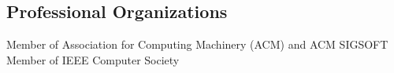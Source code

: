 \begin{resume}






\section{\secft Professional Organizations}
Member of Association for Computing Machinery (ACM) and ACM SIGSOFT\\
Member of IEEE Computer Society


\end{resume}
